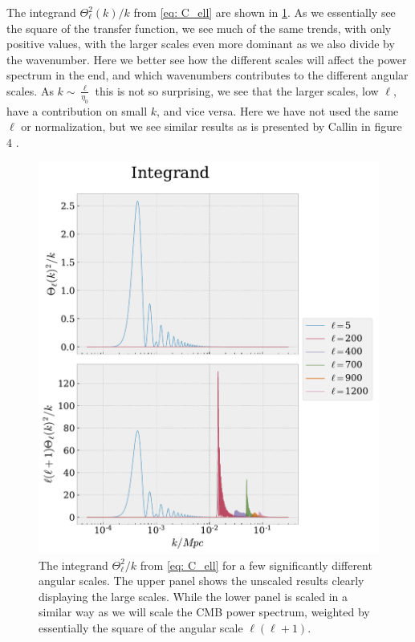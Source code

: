 \documentclass[10pt,a4paper]{article}
\begin{document}
The integrand $\Theta_\ell^2(k)/k$ from \cref{eq: C_ell} are shown in \cref{fig: integrand}. As we essentially see the square of the transfer function, we see much of the same trends, with only positive values, with the larger scales even more dominant as we also divide by the wavenumber. Here we better see how the different scales will affect the power spectrum in the end, and which wavenumbers contributes to the different angular scales. As $k\sim\frac{\ell}{\eta_0}$ this is not so surprising, we see that the larger scales, low $\ell$, have a contribution on small $k$, and vice versa. Here we have not used the same $\ell$ or normalization, but we see similar results as is presented by Callin in figure 4 \citep{Calin}.
\begin{figure}[ht!]
  \centering
  \includegraphics[scale=0.5]{../figs/transfer_integrand_integrand.pdf}
  \caption{The integrand $\Theta_\ell^2/k$ from \cref{eq: C_ell} for a few significantly different angular scales. The upper panel shows the unscaled results clearly displaying the large scales. While the lower panel is scaled in a similar way as we will scale the CMB power spectrum, weighted by essentially the square of the angular scale $\ell(\ell+1)$.}
  \label{fig: integrand}
\end{figure}
\end{document}
